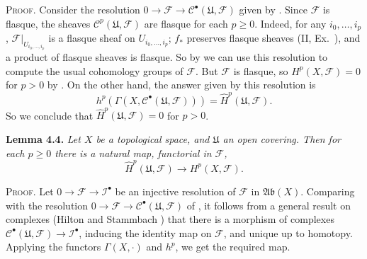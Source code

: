 {\smallskip
\noindent\textsc{Proof.} Consider the resolution $0\to\mathcal F\to\mathcal C^\bullet(\mathfrak U,\mathcal F)$ given by . Since $\mathcal F$ is flasque, the sheaves $\mathcal C^p(\mathfrak U,\mathcal F)$ are flasque for each $p\geq0$. Indeed, for any $i_0,\ldots,i_p$, $\mathcal F|_{U_{i_0,\ldots,i_p}}$ is a flasque sheaf on $U_{i_0,\ldots,i_p}$; $f_*$ preserves flasque sheaves (II, Ex.~), and a product of flasque sheaves is flasque. So by  we can use this resolution to compute the usual cohomology groups of $\mathcal F$. But $\mathcal F$ is flasque, so $H^p(X,\mathcal F)=0$ for $p>0$ by . On the other hand, the answer given by this resolution is
\[
h^p(\Gamma(X,\mathcal C^\bullet(\mathfrak U,\mathcal F)))=\widehat H^p(\mathfrak U,\mathcal F).
\]
So we conclude that $\widehat H^p(\mathfrak U,\mathcal F)=0$ for $p>0$.

\medskip
\noindent\hypertarget{result-III-4.4}{}\textbf{Lemma 4.4.} \emph{Let $X$ be a topological space, and $\mathfrak U$ an open covering. Then for each $p\geq0$ there is a natural map, functorial in $\mathcal F$,}
\[
\widehat H^p(\mathfrak U,\mathcal F)\to H^p(X,\mathcal F).
\]

\smallskip
\noindent\textsc{Proof.} Let $0\to\mathcal F\to\mathcal I^\bullet$ be an injective resolution of $\mathcal F$ in $\mathfrak{Ab}(X)$. Comparing with the resolution $0\to\mathcal F\to\mathcal C^\bullet(\mathfrak U,\mathcal F)$ of , it follows from a general result on complexes (Hilton and Stammbach ) that there is a morphism of complexes $\mathcal C^\bullet(\mathfrak U,\mathcal F)\to\mathcal I^\bullet$, inducing the identity map on $\mathcal F$, and unique up to homotopy. Applying the functors $\Gamma(X,\cdot)$ and $h^p$, we get the required map.
}
